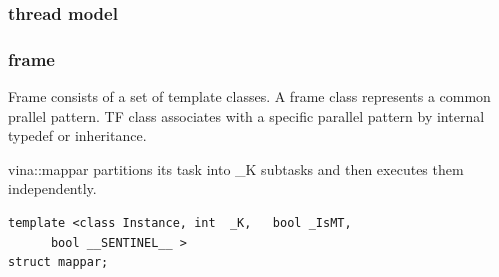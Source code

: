 \documentclass[a4paper, 11pt]{article}
\begin{document}

\subsubsection{thread model}
\subsubsection{frame}
Frame consists of a set of template classes. A frame class represents a common prallel pattern. TF class associates with a specific parallel pattern by internal typedef or inheritance. 

vina::mappar partitions its task into \_K subtasks and then executes them independently.  
\begin{verbatim}
template <class Instance, int  _K,   bool _IsMT,
	  bool __SENTINEL__ >
struct mappar;
\end{verbatim}
\end{document}
